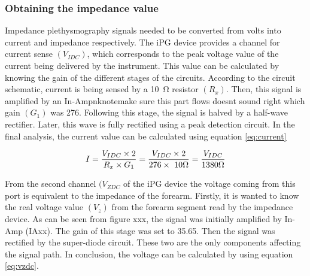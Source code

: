 
\subsubsection{Obtaining the impedance value}
Impedance plethysmography signals needed to be converted from volts into current and impedance respectively. The iPG device provides a channel for current sense $(V_{IDC})$, which corresponds to the peak voltage value of the current being delivered by the instrument. This value can be calculated by knowing the gain of the different stages of the circuits. According to the circuit schematic, current is being sensed by a \SI{10}{\ohm} resistor $(R_x)$. Then, this signal is amplified by an In-Ampnknote{make sure this part flows doesnt sound right} which gain $(G_1)$ was 276. Following this stage, the signal is halved by a half-wave rectifier. Later, this wave is fully rectified using a peak detection circuit. In the final analysis, the current value can be calculated using equation \ref{eq:current}

\begin{align}
	\label{eq:current}
	I = \frac{V_{IDC} \times 2}{R_x \times G_1} = \frac{V_{IDC} \times 2}{276 \times\ 10 \Omega} = \frac{V_{IDC}}{1380 \Omega} \tagaddtext{[\si{\ampere}]}
\end{align}


From the second channel $(V_{ZDC}$ of the iPG device the voltage coming from this port is equivalent to the impedance of the forearm. Firstly, it is wanted to know the real voltage value  $(V_z)$ from the forearm segment read by the impedance device. As can be seen from figure xxx, the signal was initially amplified by In-Amp (IAxx). The gain of this stage was set to 35.65. Then the signal was rectified by the super-diode circuit. These two are the only components affecting the signal path. In conclusion, the voltage can be calculated by using equation \ref{eq:vzdc}.

